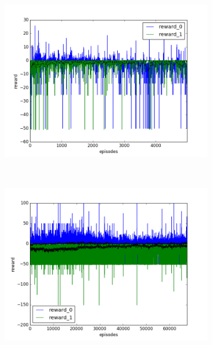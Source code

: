 \begin{figure}[t]
  \vspace{-0.5cm}
  \begin{subfigure}[t]{\figscale\linewidth}
    \hspace*{-2.75cm}
    \includegraphics[width=1.5\textwidth]
    {../results/dqn_1vs1/reward.png}
    \label{fig:dqn-1vs1-reward}
  \end{subfigure}
  ~
  \begin{subfigure}[t]{\figscale\linewidth}
    \hspace*{-1.4cm}
    \includegraphics[width=1.5\textwidth]
    {../results/ddpg_1vs1/reward.png}
    \label{fig:ddpg-1vs1-reward}
  \end{subfigure}
  ~
  \begin{subfigure}[t]{\figscale\linewidth}

\end{subfigure}
\end{figure}
